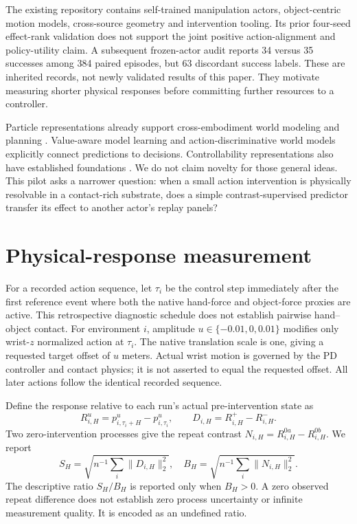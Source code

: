 \documentclass[10pt]{article}
\begin{document}
The existing repository contains self-trained manipulation actors, object-centric motion
models, cross-source geometry and intervention tooling. Its prior four-seed effect-rank
validation does not support the joint positive action-alignment and policy-utility claim.
A subsequent frozen-actor audit reports 34 versus 35 successes among 384 paired episodes,
but 63 discordant success labels. These are inherited records, not newly validated
results of this paper. They motivate measuring shorter physical responses before
committing further resources to a controller.

Particle representations already support cross-embodiment world modeling and planning
\cite{he2025}. Value-aware model learning \cite{farahmand2017} and action-discriminative
world models \cite{qiu2026} explicitly connect predictions to decisions. Controllability
representations also have established foundations \cite{rudolph2024}. We do not claim
novelty for those general ideas. This pilot asks a narrower question: when a small action
intervention is physically resolvable in a contact-rich substrate, does a simple
contrast-supervised predictor transfer its effect to another actor's replay panels?

\section{Physical-response measurement}
For a recorded action sequence, let $\tau_i$ be the control step immediately after the
first reference event where both the native hand-force and object-force proxies are active.
This retrospective diagnostic schedule does not establish pairwise hand--object contact.
For environment $i$, amplitude $u\in\{-0.01,0,0.01\}$ modifies only wrist-$z$ normalized
action at $\tau_i$. The native translation scale is one, giving a requested target
offset of $u$ meters. Actual wrist motion is governed by the PD controller and contact
physics; it is not asserted to equal the requested offset. All later actions follow
the identical recorded sequence.

Define the response relative to each run's actual pre-intervention state as
\begin{equation}
 R_{i,H}^{u}=p_{i,\tau_i+H}^{u}-p_{i,\tau_i}^{u},
 \qquad D_{i,H}=R_{i,H}^{+}-R_{i,H}^{-}.
\end{equation}
Two zero-intervention processes give the repeat contrast
$N_{i,H}=R_{i,H}^{0a}-R_{i,H}^{0b}$. We report
\begin{equation}
 S_H=\sqrt{n^{-1}\sum_i\|D_{i,H}\|_2^2},\quad
 B_H=\sqrt{n^{-1}\sum_i\|N_{i,H}\|_2^2}.
\end{equation}
The descriptive ratio $S_H/B_H$ is reported only when $B_H>0$. A zero observed repeat
difference does not establish zero process uncertainty or infinite measurement quality.
It is encoded as an undefined ratio.
\end{document}
